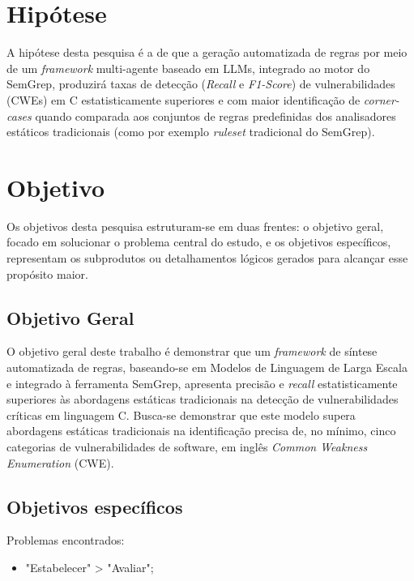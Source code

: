\documentclass[
    12pt,                %
    openright,           %
    oneside,             %
    a4paper,             %
    english,             %
    brazil               %
]{abntex2}
\begin{document}
\begin{itemize}
\section{Hipótese}
\label{sec:hipotese}
\par
A hipótese desta pesquisa é a de que a geração automatizada de regras por meio de um \textit{framework} multi-agente baseado em LLMs, integrado ao motor do SemGrep, produzirá taxas de detecção (\textit{Recall} e \textit{F1-Score}) de vulnerabilidades (CWEs) em C estatisticamente superiores e com maior identificação de \textit{corner-cases} quando comparada aos conjuntos de regras predefinidas dos analisadores estáticos tradicionais (como por exemplo \textit{ruleset} tradicional do SemGrep).

\section{Objetivo}
\label{sec:objetivo}
\par
Os objetivos desta pesquisa estruturam-se em duas frentes: o objetivo geral, focado em solucionar o problema central do estudo, e os objetivos específicos, representam os subprodutos ou detalhamentos lógicos gerados para alcançar esse propósito maior.

\subsection{Objetivo Geral}
\label{sec:objgeral}
\par
O objetivo geral deste trabalho é demonstrar que um \textit{framework} de síntese automatizada de regras, baseando-se em Modelos de Linguagem de Larga Escala e integrado à ferramenta SemGrep, apresenta precisão e \textit{recall} estatisticamente superiores às abordagens estáticas tradicionais na detecção de vulnerabilidades críticas em linguagem C.
Busca-se demonstrar que este modelo supera abordagens estáticas tradicionais na identificação precisa de, no mínimo, cinco categorias de vulnerabilidades de software, em inglês \textit{Common Weakness Enumeration} (CWE).

\subsection{Objetivos específicos}
\label{sec:objespecifico}

\par
Problemas encontrados:

\begin{itemize}
  \item "Estabelecer" > "Avaliar";
\end{itemize}


\end{itemize}
\end{document}
